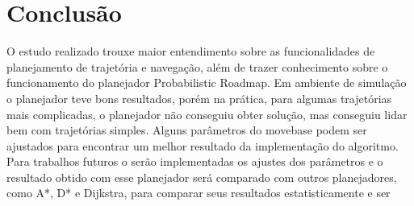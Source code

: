 \chapter{Conclusão}
\label{chap:conc}

O estudo realizado trouxe maior entendimento sobre as funcionalidades de planejamento de trajetória e navegação, além de trazer conhecimento sobre o funcionamento do planejador Probabilistic Roadmap. Em ambiente de simulação o planejador teve bons resultados, porém na prática, para algumas trajetórias mais complicadas, o planejador não conseguiu obter solução, mas conseguiu lidar bem com trajetórias simples. Alguns parâmetros do move\textunderscore base podem ser ajustados para encontrar um melhor resultado da implementação do algoritmo. Para trabalhos futuros o serão implementadas os ajustes dos parâmetros e o resultado obtido com esse planejador será comparado com outros planejadores, como A*, D* e Dijkstra, para comparar seus resultados estatisticamente e ser